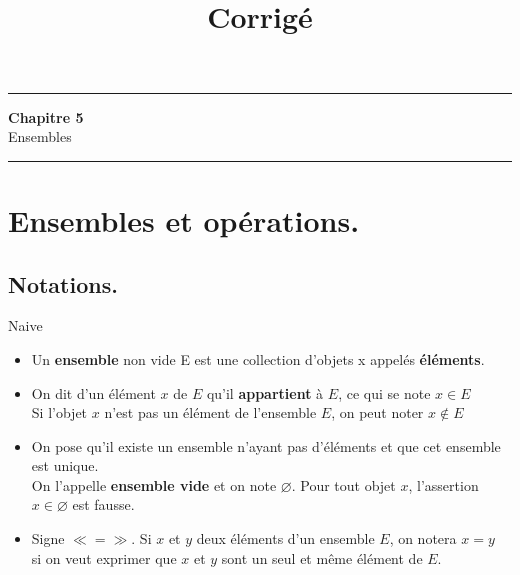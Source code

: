 \documentclass[11pt]{article}
\title{\bf{\pagetitle}\\\large{Corrigé}}
\def\pagetitle{Ensembles}
\newcommand{\0}{\varnothing}
\begin{document}
\thispagestyle{fancy}
\fancyhead[C]{\pagetitle}

\hrule
\begin{center}
    \LARGE{\textbf{Chapitre 5}}\\
    \large{\pagetitle}\\
    \rule{0.8\textwidth}{0.5pt}
\end{center}


\vspace{0.5cm}

\section{Ensembles et opérations.}
\subsection{Notations.}

\begin{defi}{Naive}{}
    \begin{itemize}
        \item Un \textbf{ensemble} non vide E est une collection d'objets x appelés \textbf{éléments}.
        \item On dit d'un élément $x$ de $E$ qu'il \textbf{appartient} à $E$, ce qui se note $x \in E$\\
        Si l'objet $x$ n'est pas un élément de l'ensemble $E$, on peut noter $x \notin E$
        \item On pose qu'il existe un ensemble n'ayant pas d'éléments et que cet ensemble est unique.\\
        On l'appelle \textbf{ensemble vide} et on note $\0$. Pour tout objet $x$, l'assertion $x \in \0$ est fausse.
        \item Signe $\ll = \gg$. Si $x$ et $y$ deux éléments d'un ensemble $E$, on notera $x = y$ \\
        si on veut exprimer que $x$ et $y$ sont un seul et même élément de $E$.
    \end{itemize}
\end{defi}
\end{document}
